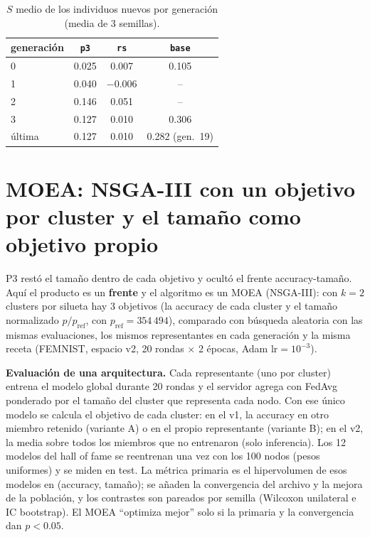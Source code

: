\documentclass[11pt,a4paper]{article}
\begin{document}
\begin{table}[h]
\centering\small
\begin{tabular}{lccc}
\toprule
generación & \texttt{p3} & \texttt{rs} & \texttt{base}\\
\midrule
0 & 0.025 & 0.007 & 0.105\\
1 & 0.040 & $-0.006$ & --\\
2 & 0.146 & 0.051 & --\\
3 & 0.127 & 0.010 & 0.306\\
última & 0.127 & 0.010 & 0.282 (gen.\ 19)\\
\bottomrule
\end{tabular}
\caption{$S$ medio de los individuos nuevos por generación (media de 3 semillas).}
\label{tab:evo}
\end{table}

\section{MOEA: NSGA-III con un objetivo por cluster y el tamaño como objetivo propio}
\label{sec:moea}
P3 restó el tamaño dentro de cada objetivo y ocultó el frente accuracy-tamaño. Aquí el producto es un \textbf{frente} y el algoritmo es un MOEA (NSGA-III): con $k=2$ clusters por silueta hay 3 objetivos (la accuracy de cada cluster y el tamaño normalizado $p/p_{\mathrm{ref}}$, con $p_{\mathrm{ref}}=354\,494$), comparado con búsqueda aleatoria con las mismas evaluaciones, los mismos representantes en cada generación y la misma receta (FEMNIST, espacio v2, 20 rondas $\times$ 2 épocas, Adam $\mathrm{lr}=10^{-3}$).

\textbf{Evaluación de una arquitectura.} Cada representante (uno por cluster) entrena el modelo global durante 20 rondas y el servidor agrega con FedAvg ponderado por el tamaño del cluster que representa cada nodo. Con ese único modelo se calcula el objetivo de cada cluster: en el v1, la accuracy en otro miembro retenido (variante A) o en el propio representante (variante B); en el v2, la media sobre todos los miembros que no entrenaron (solo inferencia). Los 12 modelos del hall of fame se reentrenan una vez con los 100 nodos (pesos uniformes) y se miden en test. La métrica primaria es el hipervolumen de esos modelos en (accuracy, tamaño); se añaden la convergencia del archivo y la mejora de la población, y los contrastes son pareados por semilla (Wilcoxon unilateral e IC bootstrap). El MOEA ``optimiza mejor'' solo si la primaria y la convergencia dan $p<0.05$.
\end{document}
